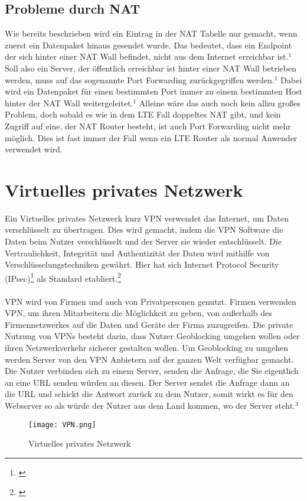 \subsection{Probleme durch NAT}
Wie bereits beschrieben wird ein Eintrag in der NAT Tabelle nur gemacht, wenn zuerst ein Datenpaket hinaus gesendet wurde. Das bedeutet, dass ein Endpoint der sich hinter einer NAT Wall befindet, nicht aus dem Internet erreichbar ist.$^{1}$ Soll also ein Server, der öffentlich erreichbar ist hinter einer NAT Wall betrieben werden, muss auf das sogenannte Port Forwarding zurückgegriffen werden.$^{1}$ Dabei wird ein Datenpaket für einen bestimmten Port immer zu einem bestimmten Host hinter der NAT Wall weitergeleitet.$^{1}$ Alleine wäre das auch noch kein allzu großes Problem, doch sobald es wie in dem LTE Fall doppeltes NAT gibt, und kein Zugriff auf eine, der NAT Router besteht, ist auch Port Forwarding nicht mehr möglich. Dies ist fast immer der Fall wenn ein LTE Router als normal Anwender verwendet wird.


\section{Virtuelles privates Netzwerk}
Ein Virtuelles privates Netzwerk kurz VPN verwendet das Internet, um Daten verschlüsselt zu übertragen. Dies wird gemacht, indem die VPN Software die Daten beim Nutzer verschlüsselt und der Server sie wieder entschlüsselt. Die Vertraulichkeit, Integrität und Authentizität der Daten wird mithilfe von Verschlüsselungstechniken gewährt. Hier hat sich Internet Protocol Security (IPsec)\footnote[2]{\cite[Vgl.][]{31}} als Standard etabliert.\footnote[3]{\cite[Vgl.][]{29}}
\\\\
VPN wird von Firmen und auch von Privatpersonen genutzt. Firmen verwenden VPN, um ihren Mitarbeitern die Möglichkeit zu geben, von außerhalb des Firmennetzwerkes auf die Daten und Geräte der Firma zuzugreifen. Die private Nutzung von VPNs besteht darin, dass Nutzer Geoblocking umgehen wollen oder ihren Netzwerkverkehr sicherer gestalten wollen. Um Geoblocking zu umgehen werden Server von den VPN Anbietern auf der ganzen Welt verfügbar gemacht. Die Nutzer verbinden sich zu einem Server, senden die Anfrage, die Sie eigentlich an eine URL senden würden an diesen. Der Server sendet die Anfrage dann an die URL und schickt die Antwort zurück zu dem Nutzer, somit wirkt es für den Webserver so als würde der Nutzer aus dem Land kommen, wo der Server steht.$^{3}$
\begin{figure}[H]
    \centering
    \texttt{[image: VPN.png]}
    \caption[Virtuelles privates Netzwerk]{Virtuelles privates Netzwerk} 
\end{figure} 


